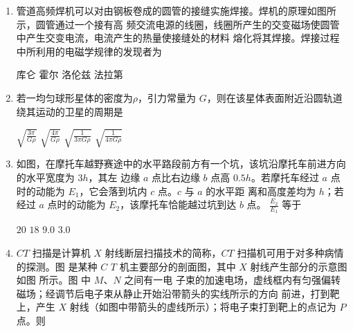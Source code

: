 


\gaokaoxz


\begin{enumerate}
\item
管道高频焊机可以对由钢板卷成的圆管的接缝实施焊接。焊机的原理如图所示，圆管通过一个接有高
频交流电源的线圈，线圈所产生的交变磁场使圆管中产生交变电流，电流产生的热量使接缝处的材料
熔化将其焊接。焊接过程中所利用的电磁学规律的发现者为  
\begin{figure}[h!]
\centering

\end{figure}


\fourchoices
{库仑}
{霍尔}
{洛伦兹}
{法拉第}




\item
若一均匀球形星体的密度为$ \rho $，引力常量为 $ G $，则在该星体表面附近沿圆轨道绕其运动的卫星的周期是  

\fourchoices
{$\sqrt{\frac{3 \pi}{G \rho}}$}
{$ \sqrt{\frac{4 \pi}{G \rho}}$}
{$ \sqrt{\frac{1}{3 \pi G \rho}}$}
{$\sqrt{\frac{1}{4 \pi G \rho}}$}



\item
如图，在摩托车越野赛途中的水平路段前方有一个坑，该坑沿摩托车前进方向的水平宽度为 $ 3h $，其左
边缘 $ a $ 点比右边缘 $ b $ 点高 $ 0.5h $。若摩托车经过 $ a $ 点时的动能为 $ E_{1} $，它会落到坑内 $ c $ 点。$ c $ 与 $ a $ 的水平距
离和高度差均为 $ h $；若经过 $ a $ 点时的动能为 $ E_{2} $，该摩托车恰能越过坑到达 $ b $ 点。
$\frac{E_{2}}{E_{1}}$
等于  
\begin{figure}[h!]
\centering

\end{figure}


\fourchoices
{$ 20 $}
{$ 18 $}
{$ 9.0 $}
{$ 3.0 $}




\item
$ CT $ 扫描是计算机 $ X $ 射线断层扫描技术的简称，$ CT $ 扫描机可用于对多种病情的探测。图  是某种 $ C $
$ T $ 机主要部分的剖面图，其中 $ X $ 射线产生部分的示意图如图  所示。图  中 $ M $、$ N $ 之间有一电
子束的加速电场，虚线框内有匀强偏转磁场；经调节后电子束从静止开始沿带箭头的实线所示的方向
前进，打到靶上，产生 $ X $ 射线（如图中带箭头的虚线所示）；将电子束打到靶上的点记为 $ P $ 点。则  
\begin{figure}[h!]
\centering
\begin{subfigure}{0.45\linewidth}
\centering
 
\caption{}\label{2020:全国2:4a}
\end{subfigure}
\hfil
\begin{subfigure}{0.45\linewidth}
\centering
 
\caption{}\label{2020:全国2:4b}
\end{subfigure}


\end{figure}
\end{enumerate}
